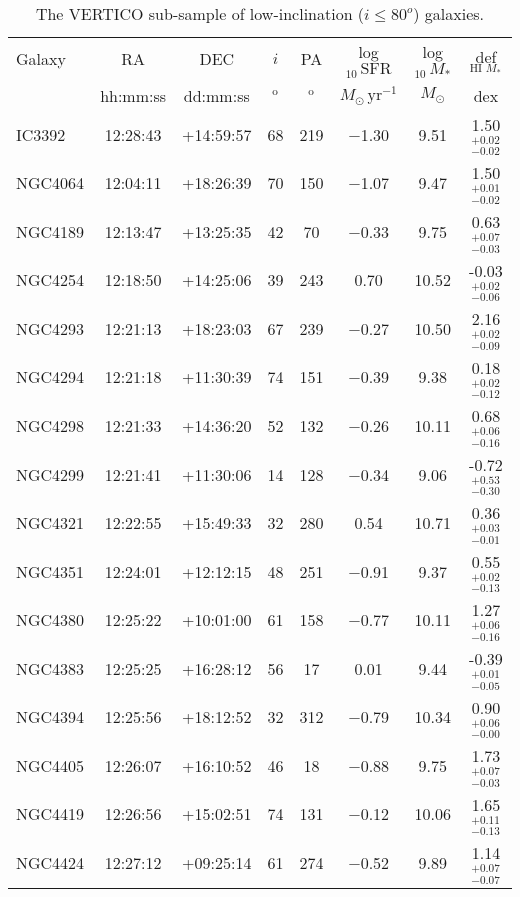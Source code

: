 \documentclass[longauth]{aa}
\begin{document}
\begin{table*}
\centering
\caption{The VERTICO sub-sample of low-inclination ($i\leq80^o$) galaxies.} 
\begin{tabular}{lccccccc}
\hline
\hline
Galaxy & RA & DEC & $i$ & PA & log$_{10}\,{\textrm{SFR}}$ & log$_{10}\,{M_*}$ & def$_{\mathrm{HI}\,\,M_*}$\\
& hh:mm:ss & dd:mm:ss & $^\mathrm{o}$ & $^\mathrm{o}$ & $M_{\odot}\,\mathrm{yr}^{-1}$ & $M_{\odot}$ & dex \\
\hline 
IC3392 & 12:28:43 & +14:59:57 & 68 & 219 & $-$1.30 & 9.51 & 1.50 $^{+ 0.02 } _{- 0.02}$\\
NGC4064 & 12:04:11 & +18:26:39 & 70 & 150 & $-$1.07 & 9.47 & 1.50 $^{+ 0.01} _{- 0.02}$\\
NGC4189 & 12:13:47 & +13:25:35 & 42 & 70 & $-$0.33 & 9.75 & 0.63 $^{+ 0.07} _{- 0.03}$\\
NGC4254 & 12:18:50 & +14:25:06 & 39 & 243 & 0.70 & 10.52 & -0.03 $^{+ 0.02} _{- 0.06}$ \\
NGC4293 & 12:21:13 & +18:23:03 & 67 & 239 & $-$0.27 & 10.50 & 2.16 $^{+ 0.02} _{- 0.09}$\\
NGC4294 & 12:21:18 & +11:30:39 & 74 & 151 & $-$0.39 & 9.38 & 0.18 $^{+ 0.02} _{- 0.12}$\\
NGC4298 & 12:21:33 & +14:36:20 & 52 & 132 & $-$0.26 & 10.11 & 0.68 $^{+ 0.06} _{- 0.16}$\\
NGC4299 & 12:21:41 & +11:30:06 & 14 & 128 & $-$0.34 & 9.06 & -0.72 $^{+ 0.53 } _{- 0.30}$\\
NGC4321 & 12:22:55 & +15:49:33 & 32 & 280 & 0.54 & 10.71 & 0.36 $^{+ 0.03} _{- 0.01}$\\
NGC4351 & 12:24:01 & +12:12:15 & 48 & 251 & $-$0.91 & 9.37 & 0.55 $^{+ 0.02} _{- 0.13}$\\
NGC4380 & 12:25:22 & +10:01:00 & 61 & 158 & $-$0.77 & 10.11 & 1.27 $^{+ 0.06} _{- 0.16}$\\
NGC4383 & 12:25:25 & +16:28:12 & 56 & 17 & 0.01 & 9.44 & -0.39 $^{+ 0.01 } _{- 0.05}$\\
NGC4394 & 12:25:56 & +18:12:52 & 32 & 312 & $-$0.79 & 10.34 & 0.90 $^{+ 0.06} _{- 0.00}$\\
NGC4405 & 12:26:07 & +16:10:52 & 46 & 18 & $-$0.88 & 9.75 & 1.73 $^{+ 0.07} _{- 0.03}$\\
NGC4419 & 12:26:56 & +15:02:51 & 74 & 131 & $-$0.12 & 10.06 & 1.65 $^{+ 0.11 } _{- 0.13}$\\
NGC4424 & 12:27:12 & +09:25:14 & 61 & 274 & $-$0.52 & 9.89 & 1.14 $^{+ 0.07} _{- 0.07}$\\

\end{tabular}
\end{table*}
\end{document}
